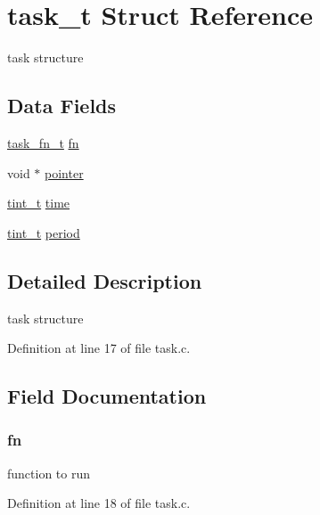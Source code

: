 \hypertarget{structtask__t}{}\section{task\+\_\+t Struct Reference}
\label{structtask__t}


task structure  


\subsection*{Data Fields}
\begin{DoxyCompactItemize}
\item 
\hyperlink{group__task_ga318336c763a22ea5f1c49c52ac5b6fe2}{task\+\_\+fn\+\_\+t} \hyperlink{structtask__t_a330ca8d643b22ae5eff48ff20b55d6ee}{fn}
\item 
void $\ast$ \hyperlink{structtask__t_abc7cbbec1f024bd23164936bd765b06d}{pointer}
\item 
\hyperlink{group__timing_gaef97c9386393beb1be4ed0b1513ee481}{tint\+\_\+t} \hyperlink{structtask__t_a05fc1718d6d2f42ca52a95e8e3067111}{time}
\item 
\hyperlink{group__timing_gaef97c9386393beb1be4ed0b1513ee481}{tint\+\_\+t} \hyperlink{structtask__t_abed99c1776ff770f1377d8f97a366a4b}{period}
\end{DoxyCompactItemize}


\subsection{Detailed Description}
task structure 

Definition at line 17 of file task.\+c.



\subsection{Field Documentation}
\hypertarget{structtask__t_a330ca8d643b22ae5eff48ff20b55d6ee}{}
\subsubsection[{fn}]{ fn}\label{structtask__t_a330ca8d643b22ae5eff48ff20b55d6ee}
function to run 

Definition at line 18 of file task.\+c.

\hypertarget{structtask__t_abed99c1776ff770f1377d8f97a366a4b}{}
